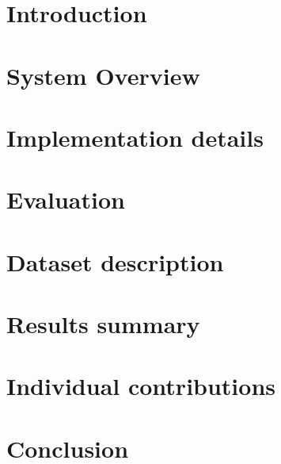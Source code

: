 \documentclass[english]{article}
\begin{document}
\tableofcontents
\newpage

\section{Introduction}

\section{System Overview}

\section{Implementation details}

\section{Evaluation}

\section{Dataset description}

\section{Results summary}

\section{Individual contributions}

\section{Conclusion}


\begin{thebibliography}{1}
	
	

\end{thebibliography}
\end{document}
